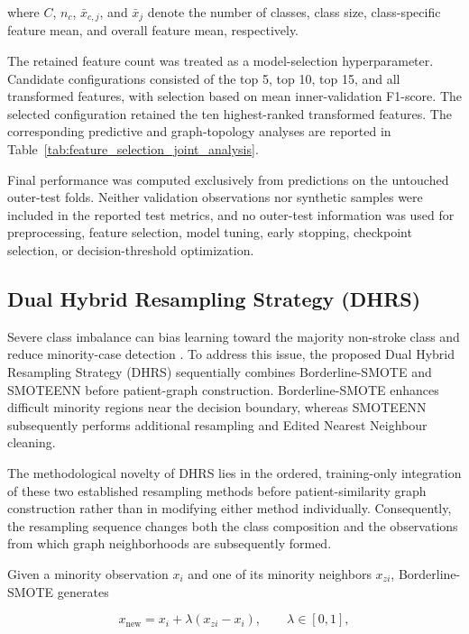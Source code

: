 \documentclass[pdflatex,sn-mathphys-num]{sn-jnl}%
\theoremstyle{thmstyleone}%
\theoremstyle{thmstyletwo}%
\theoremstyle{thmstylethree}%
\begin{document}
where \(C\), \(n_c\), \(\bar{x}_{c,j}\), and \(\bar{x}_{j}\) denote the
number of classes, class size, class-specific feature mean, and overall
feature mean, respectively.

 {
The retained feature count was treated as a model-selection hyperparameter.
Candidate configurations consisted of the top 5, top 10, top 15, and all
transformed features, with selection based on mean inner-validation F1-score.
The selected configuration retained the ten highest-ranked transformed
features. The corresponding predictive and graph-topology analyses are
reported in Table~\ref{tab:feature_selection_joint_analysis}.
}

 {
Final performance was computed exclusively from predictions on the untouched
outer-test folds. Neither validation observations nor synthetic samples were
included in the reported test metrics, and no outer-test information was used
for preprocessing, feature selection, model tuning, early stopping, checkpoint
selection, or decision-threshold optimization.
}
\subsection{Dual Hybrid Resampling Strategy (DHRS)}
\label{subsec:dhrs}

Severe class imbalance can bias learning toward the majority non-stroke class
and reduce minority-case detection
\cite{he2009learning,haixiang2017learning}. To address this issue, the proposed
Dual Hybrid Resampling Strategy (DHRS) sequentially combines Borderline-SMOTE
and SMOTEENN before patient-graph construction. Borderline-SMOTE enhances
difficult minority regions near the decision boundary, whereas SMOTEENN
subsequently performs additional resampling and Edited Nearest Neighbour
cleaning.

 {
The methodological novelty of DHRS lies in the ordered, training-only
integration of these two established resampling methods before
patient-similarity graph construction rather than in modifying either method
individually. Consequently, the resampling sequence changes both the
class composition and the observations from which graph neighborhoods are
subsequently formed.
}

Given a minority observation \(x_i\) and one of its minority neighbors
\(x_{zi}\), Borderline-SMOTE generates

\begin{equation}
x_{\mathrm{new}}
=
x_i+
\lambda(x_{zi}-x_i),
\qquad
\lambda\in[0,1],
\label{eq:borderline_smote}
\end{equation}
\end{document}
